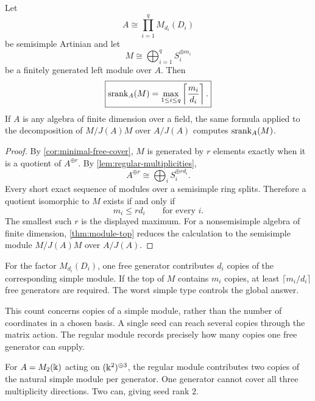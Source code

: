 \begin{theorem}
\label{thm:semisimple-seed-rank}
Let
\[
A\cong\prod_{i=1}^{q}M_{d_i}(D_i)
\]
be semisimple Artinian and let
\[
M\cong\bigoplus_{i=1}^{q}S_i^{\oplus m_i}
\]
be a finitely generated left module over $A$.  Then
\[
\boxed{
\operatorname{srank}_A(M)
=
\max_{1\leq i\leq q}
\left\lceil\frac{m_i}{d_i}\right\rceil.
}
\]
If $A$ is any algebra of finite dimension over a field, the same formula applied to the decomposition of $M/J(A)M$ over $A/J(A)$ computes $\operatorname{srank}_A(M)$.
\end{theorem}

\begin{proof}
By \cref{cor:minimal-free-cover}, $M$ is generated by $r$ elements exactly when it is a quotient of $A^{\oplus r}$.  By \cref{lem:regular-multiplicities},
\[
A^{\oplus r}\cong\bigoplus_iS_i^{\oplus rd_i}.
\]
Every short exact sequence of modules over a semisimple ring splits.  Therefore a quotient isomorphic to $M$ exists if and only if
\[
m_i\leq rd_i
\qquad\text{for every }i.
\]
The smallest such $r$ is the displayed maximum.  For a nonsemisimple algebra of finite dimension, \cref{thm:module-top} reduces the calculation to the semisimple module $M/J(A)M$ over $A/J(A)$.
\end{proof}

\begin{interpretation}
For the factor \(M_{d_i}(D_i)\), one free generator contributes \(d_i\) copies of the corresponding simple module.  If the top of \(M\) contains \(m_i\) copies, at least \(\lceil m_i/d_i\rceil\) free generators are required.  The worst simple type controls the global answer.

This count concerns copies of a simple module, rather than the number of coordinates in a chosen basis.  A single seed can reach several copies through the matrix action.  The regular module records precisely how many copies one free generator can supply.
\end{interpretation}

\begin{microexample}[title={Multiplicity consumes seed capacity}]
For \(A=M_2(\Bbbk)\) acting on \((\Bbbk^2)^{\oplus3}\), the regular module contributes two copies of the natural simple module per generator.  One generator cannot cover all three multiplicity directions.  Two can, giving seed rank \(2\).
\end{microexample}


